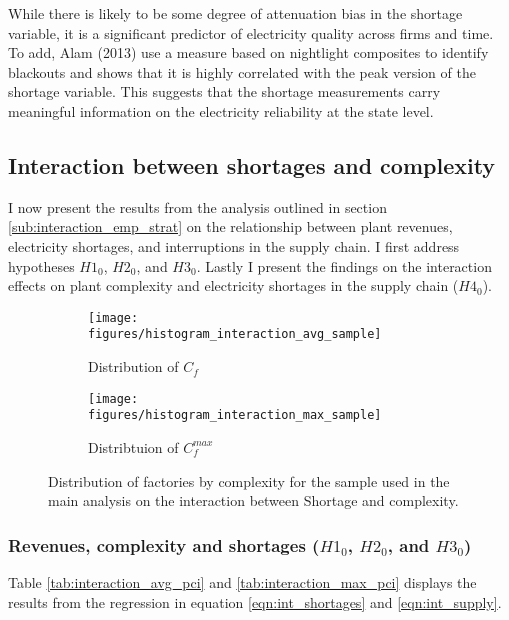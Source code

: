 \documentclass[11pt]{article}
\begin{document}
While there is likely to be some degree of attenuation bias in the shortage variable, it is a significant predictor of electricity quality across firms and time. To add, Alam (2013) use a measure based on nightlight composites to identify blackouts and shows that it is highly correlated with the peak version of the shortage variable. This suggests that the shortage measurements carry meaningful information on the electricity reliability at the state level.

\subsection{Interaction between shortages and complexity}%
\label{sub:regressions}

I now present the results from the analysis outlined in section \ref{sub:interaction_emp_strat} on the relationship between plant revenues, electricity shortages, and interruptions in the supply chain. I first address hypotheses $H1_0$, $H2_0$, and $H3_0$. Lastly I present the findings on the interaction effects on plant complexity and electricity shortages in the supply chain ($H4_0$).

\begin{figure}
     \centering
     \begin{subfigure}[b]{0.45\textwidth}
         \centering
         \texttt{[image: figures/histogram\_interaction\_avg\_sample]}
	 \caption{Distribution of $C_f$}
         \label{fig:interaction_sample_avg}
     \end{subfigure}
     \hfill
     \begin{subfigure}[b]{0.45\textwidth}
         \centering
         \texttt{[image: figures/histogram\_interaction\_max\_sample]}
	 \caption{Distribtuion of $C^{max}_{f}$}
         \label{fig:interaction_sample_max}
     \end{subfigure}
     \caption[Distribution of factories by complexity in interaction sample]{Distribution of factories by complexity for the sample used in the main analysis on the interaction between Shortage and complexity.}
        \label{fig:interaction_sample}
\end{figure}

\subsubsection{Revenues, complexity and shortages ($H1_0$, $H2_0$, and $H3_0$)}
\label{sub:h123}
Table \ref{tab:interaction_avg_pci} and \ref{tab:interaction_max_pci} displays the results from the regression in equation \ref{eqn:int_shortages} and \ref{eqn:int_supply}.
\end{document}
